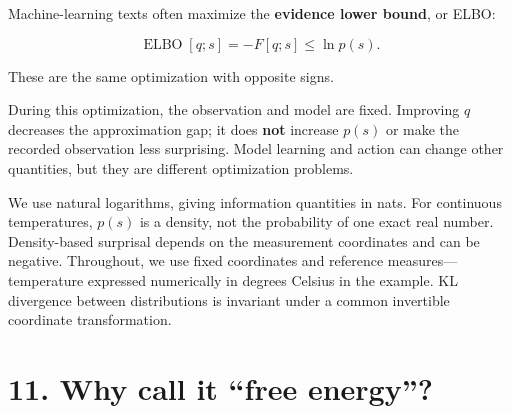 \documentclass[
  letterpaper,
  DIV=11,
  numbers=noendperiod]{scrreprt}
\begin{document}
Machine-learning texts often maximize the \textbf{evidence lower bound},
or ELBO:

\[
\operatorname{ELBO}[q;s]=-F[q;s]\leq\ln p(s).
\]

These are the same optimization with opposite signs.

\begin{tcolorbox}[enhanced jigsaw, arc=.35mm, bottomrule=.15mm, bottomtitle=1mm, breakable, colback=white, colbacktitle=quarto-callout-important-color!10!white, colframe=quarto-callout-important-color-frame, coltitle=black, left=2mm, leftrule=.75mm, opacityback=0, opacitybacktitle=0.6, rightrule=.15mm, title=\textcolor{quarto-callout-important-color}{\faExclamation}\hspace{0.5em}{What does inference improve?}, titlerule=0mm, toprule=.15mm, toptitle=1mm]

During this optimization, the observation and model are fixed. Improving
\(q\) decreases the approximation gap; it does \textbf{not} increase
\(p(s)\) or make the recorded observation less surprising. Model
learning and action can change other quantities, but they are different
optimization problems.

\end{tcolorbox}

\begin{tcolorbox}[enhanced jigsaw, arc=.35mm, bottomrule=.15mm, bottomtitle=1mm, breakable, colback=white, colbacktitle=quarto-callout-note-color!10!white, colframe=quarto-callout-note-color-frame, coltitle=black, left=2mm, leftrule=.75mm, opacityback=0, opacitybacktitle=0.6, rightrule=.15mm, title=\textcolor{quarto-callout-note-color}{\faInfo}\hspace{0.5em}{A note on continuous densities and units}, titlerule=0mm, toprule=.15mm, toptitle=1mm]

We use natural logarithms, giving information quantities in nats. For
continuous temperatures, \(p(s)\) is a density, not the probability of
one exact real number. Density-based surprisal depends on the
measurement coordinates and can be negative. Throughout, we use fixed
coordinates and reference measures---temperature expressed numerically
in degrees Celsius in the example. KL divergence between distributions
is invariant under a common invertible coordinate transformation.

\end{tcolorbox}

\section{11. Why call it ``free
energy''?}\label{why-call-it-free-energy}
\end{document}
